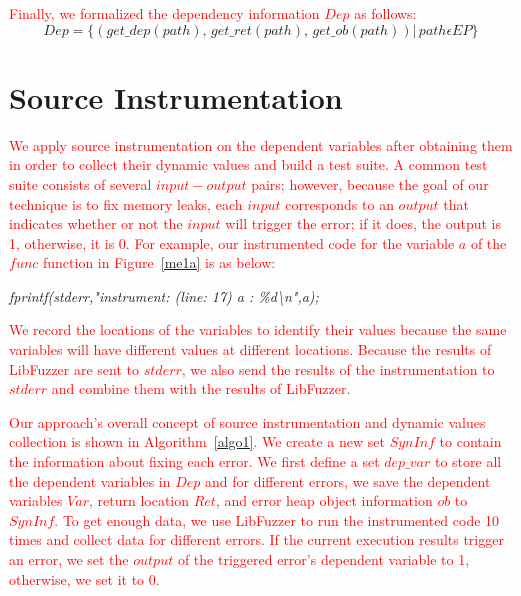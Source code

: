 \documentclass[a4paper,11pt,oneside,openany]{book}
\begin{document}
\textcolor{red}{
Finally, we formalized the dependency information $Dep$ as follows:
}
\begin{equation}
Dep=\{(get\_dep(path),\,get\_ret(path),\,get\_ob(path))|\, path \epsilon EP\}
\end{equation}

\section{Source Instrumentation}
\textcolor{red}{
We apply source instrumentation on the dependent variables after obtaining them in order to collect their dynamic values and build a test suite. A common test suite consists of several $input-output$ pairs; however, because the goal of our technique is to fix memory leaks, each $input$ corresponds to an $output$ that indicates whether or not the $input$ will trigger the error; if it does, the output is 1, otherwise, it is 0. For example, our instrumented code for the variable $a$ of the $func$ function in Figure~\ref{me1a} is as below:
}

\begin{minipage}{\textwidth}
\vspace{0.2cm}
\textsl{\hspace{0.3cm}fprintf(stderr,"instrument: (line: 17) a : \%d\textbackslash n",a);}
\vspace{0.2cm}
\end{minipage}
\textcolor{red}{
We record the locations of the variables to identify their values because the same variables will have different values at different locations. Because the results of LibFuzzer are sent to $stderr$, we also send the results of the instrumentation to $stderr$ and combine them with the results of LibFuzzer.
}

\textcolor{red}{
Our approach's overall concept of source instrumentation and dynamic values collection is shown in Algorithm~\ref{algo1}. We create a new set $SynInf$ to contain the information about fixing each error. We first define a set $dep\_var$ to store all the dependent variables in $Dep$ and for different errors, we save the dependent variables $Var$, return location $Ret$, and error heap object information $ob$ to $SynInf$. To get enough data, we use LibFuzzer to run the instrumented code 10 times and collect data for different errors. If the current execution results trigger an error, we set the $output$ of the triggered error's dependent variable to 1, otherwise, we set it to 0.
}
\end{document}

